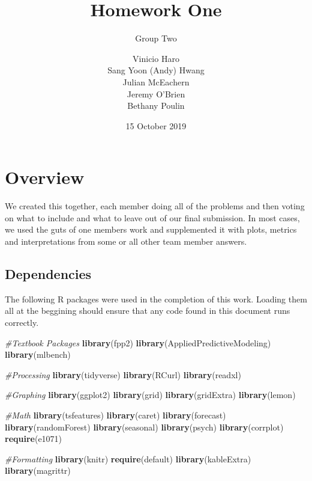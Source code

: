 \documentclass[openany]{book}
\title{Homework One}
\subtitle{Group Two}
\author{Vinicio Haro \\ Sang Yoon (Andy) Hwang \\ Julian McEachern \\ Jeremy O'Brien \\ Bethany Poulin}
\date{15 October 2019}
\newenvironment{Shaded}{\begin{snugshade}}{\end{snugshade}}
\newcommand{\CommentTok}[1]{\textcolor[rgb]{0.56,0.35,0.01}{\textit{#1}}}
\newcommand{\KeywordTok}[1]{\textcolor[rgb]{0.13,0.29,0.53}{\textbf{#1}}}
\newcommand{\NormalTok}[1]{#1}
\begin{document}
\maketitle

{
\setcounter{tocdepth}{1}
\tableofcontents
}
\hypertarget{overview}{%
\chapter*{Overview}\label{overview}}

We created this together, each member doing all of the problems and then voting on what to include and what to leave out of our final submission. In most cases, we used the guts of one members work and supplemented it with plots, metrics and interpretations from some or all other team member answers.

\hypertarget{dependencies}{%
\section{Dependencies}\label{dependencies}}

The following R packages were used in the completion of this work. Loading them all at the beggining should ensure that any code found in this document runs correctly.

\begin{Shaded}
\begin{Highlighting}[]
\CommentTok{#Textbook Packages}
\KeywordTok{library}\NormalTok{(fpp2)}
\KeywordTok{library}\NormalTok{(AppliedPredictiveModeling)}
\KeywordTok{library}\NormalTok{(mlbench)}

\CommentTok{#Processing}
\KeywordTok{library}\NormalTok{(tidyverse)}
\KeywordTok{library}\NormalTok{(RCurl)}
\KeywordTok{library}\NormalTok{(readxl)}

\CommentTok{#Graphing}
\KeywordTok{library}\NormalTok{(ggplot2)}
\KeywordTok{library}\NormalTok{(grid)}
\KeywordTok{library}\NormalTok{(gridExtra)}
\KeywordTok{library}\NormalTok{(lemon)}

\CommentTok{#Math}
\KeywordTok{library}\NormalTok{(tsfeatures)}
\KeywordTok{library}\NormalTok{(caret)}
\KeywordTok{library}\NormalTok{(forecast)}
\KeywordTok{library}\NormalTok{(randomForest)}
\KeywordTok{library}\NormalTok{(seasonal)}
\KeywordTok{library}\NormalTok{(psych)}
\KeywordTok{library}\NormalTok{(corrplot)}
\KeywordTok{require}\NormalTok{(e1071)}

\CommentTok{#Formatting}
\KeywordTok{library}\NormalTok{(knitr)}
\KeywordTok{require}\NormalTok{(default)}
\KeywordTok{library}\NormalTok{(kableExtra)}
\KeywordTok{library}\NormalTok{(magrittr)}
\end{Highlighting}
\end{Shaded}
\end{document}
